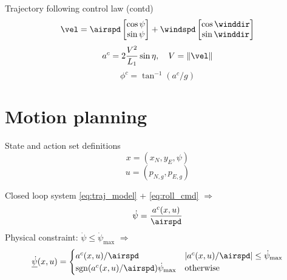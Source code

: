 \documentclass{beamer}
\begin{document}
\begin{frame}{Trajectory following control law (contd)}
    \begin{equation}
        \vel = \airspd\begin{bmatrix}
            \cos\psi \\
            \sin\psi
        \end{bmatrix}
        + \windspd\begin{bmatrix}
            \cos\winddir\\
            \sin\winddir
        \end{bmatrix}
    \end{equation}
    \begin{equation}\label{eq:lat_acc}
        a^{c}=2\frac{V^2}{L_1}\sin\eta, \quad V=\|\vel\|
    \end{equation}
    \begin{equation}\label{eq:roll_cmd}
        \phi^{c}=\tan^{-1}(a^{c}/g)
    \end{equation}
\end{frame}

\section{Motion planning}
\begin{frame}{State and action set definitions}
    \begin{equation}
        x=(x_N, y_E, \psi)
    \end{equation}
    \begin{equation}
        u=(p_{N,g}, p_{E,g})
    \end{equation}
\end{frame}

\begin{frame}{Closed loop system}
    \eqref{eq:traj_model} + \eqref{eq:roll_cmd} $\Rightarrow$
    \begin{equation}
        \dot{\psi}=\frac{a^c(x, u)}{\airspd}
    \end{equation}
    Physical constraint: $\dot{\psi}\leq\dot{\psi}_{\text{max}}$ $\Rightarrow$
    \begin{equation}\label{eq:saturation}
        \underline{\dot{\psi}}(x, u)=\begin{cases}
            a^c(x, u)/\airspd & |a^c(x, u)/\airspd| \leq \dot{\psi}_{\text{max}} \\
            \text{sgn}(a^c(x, u)/\airspd)\dot{\psi}_{\text{max}} & \text{otherwise}
        \end{cases}
    \end{equation}
\end{frame}
\end{document}
